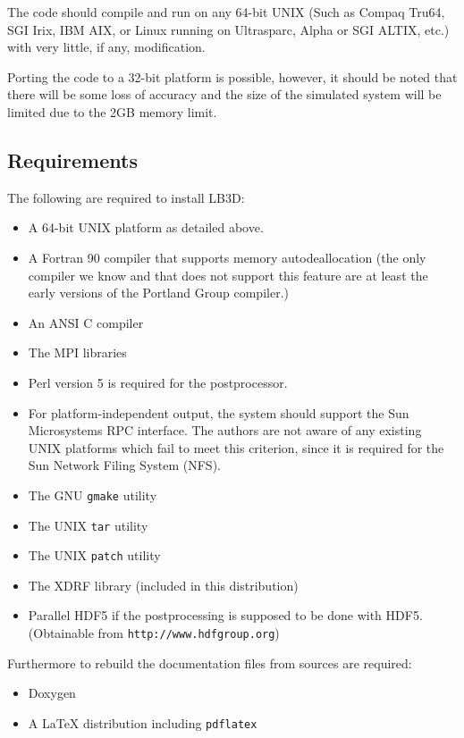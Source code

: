 \documentclass[a4paper]{article}
\begin{document}
The code should compile and run on any 64-bit UNIX (Such as Compaq Tru64, SGI
Irix, IBM AIX, or Linux running on Ultrasparc, Alpha or SGI ALTIX, etc.) with
very little, if any, modification.

Porting the code to a 32-bit platform is possible, however, it should be noted
that there will be some loss of accuracy and the size of the simulated system
will be limited due to the 2GB memory limit.

\subsection{Requirements}

The following are required to install LB3D:

\begin{itemize}
\item A 64-bit UNIX platform as detailed above.
\item A Fortran 90 compiler that supports memory autodeallocation (the only compiler we know and that does not support this feature are at least the early versions of the Portland Group compiler.)
\item An ANSI C compiler
\item The MPI libraries
\item Perl version 5 is required for the postprocessor.
\item For platform-independent output, the system should support the Sun
	Microsystems RPC interface. The authors are not aware of any
	existing UNIX platforms which fail to meet this criterion, since
	it is required for the Sun Network Filing System (NFS).
\item The GNU {\tt gmake} utility
\item The UNIX {\tt tar} utility
\item The UNIX {\tt patch} utility
\item The XDRF library (included in this distribution)
\item Parallel HDF5 if the postprocessing is supposed to be done with HDF5. (Obtainable from {\tt http://www.hdfgroup.org}) 
\end{itemize}

Furthermore to rebuild the documentation files from sources are required:

\begin{itemize}
\item Doxygen
\item A LaTeX distribution including {\tt pdflatex}
\end{itemize}
\end{document}
